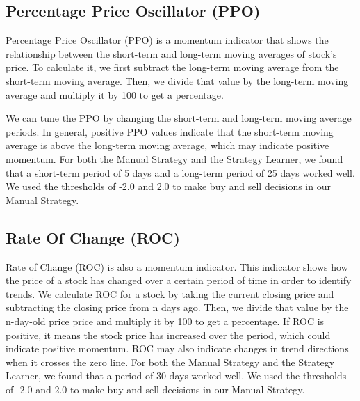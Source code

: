 \documentclass[
	letterpaper, %
]{jdf}
\begin{document}
\subsection{Percentage Price Oscillator (PPO)}
Percentage Price Oscillator (PPO) is a momentum indicator that shows the relationship between the short-term and long-term moving averages of stock's price.
To calculate it, we first subtract the long-term moving average from the short-term moving average.
Then, we divide that value by the long-term moving average and multiply it by 100 to get a percentage.

We can tune the PPO by changing the short-term and long-term moving average periods.
In general, positive PPO values indicate that the short-term moving average is above the long-term moving average, which may indicate positive momentum.
For both the Manual Strategy and the Strategy Learner, we found that a short-term period of 5 days and a long-term period of 25 days worked well.
We used the thresholds of -2.0 and 2.0 to make buy and sell decisions in our Manual Strategy.

\subsection{Rate Of Change (ROC)}
Rate of Change (ROC) is also a momentum indicator.
This indicator shows how the price of a stock has changed over a certain period of time in order to identify trends.
We calculate ROC for a stock by taking the current closing price and subtracting the closing price from n days ago.
Then, we divide that value by the  n-day-old price price and multiply it by 100 to get a percentage.
If ROC is positive, it means the stock price has increased over the period, which could indicate positive momentum.
ROC may also indicate changes in trend directions when it crosses the zero line.
For both the Manual Strategy and the Strategy Learner, we found that a period of 30 days worked well.
We used the thresholds of -2.0 and 2.0 to make buy and sell decisions in our Manual Strategy.
\end{document}
